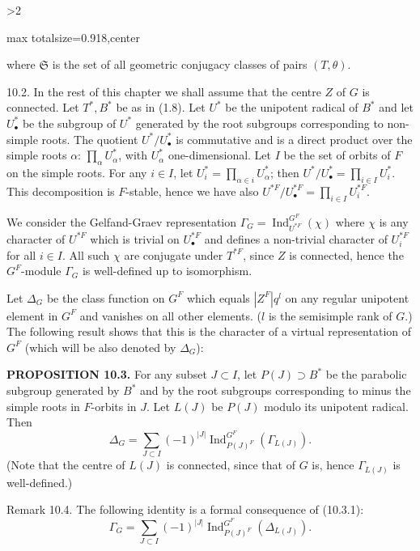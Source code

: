 \documentclass[9pt,twoside]{extarticle}
\newcommand{\EditionPage}[3]{%
  \ifnum#1>2\clearpage\fi
  \pdfbookmark[1]{Printed page #2}{en-folio-#2}%
  \hypertarget{en-physical-#1}{}%
  \noindent\begin{adjustbox}{max totalsize={\textwidth}{0.918\textheight},center}
  \begin{minipage}[t]{\textwidth}
  \fontsize{9.4}{11.1}\selectfont\justifying
  #3
  \end{minipage}
  \end{adjustbox}%
}
\begin{document}
\EditionPage{54}{155}{%
where \(\mathfrak S\) is the set of all geometric conjugacy classes of pairs \((T,\theta)\).\par

10.2. In the rest of this chapter we shall assume that the centre \(Z\) of \(G\) is connected. Let \(T^*,B^*\) be as in (1.8). Let \(U^*\) be the unipotent radical of \(B^*\) and let \(U_\bullet^*\) be the subgroup of \(U^*\) generated by the root subgroups corresponding to non-simple roots. The quotient \(U^*/U_\bullet^*\) is commutative and is a direct product over the simple roots \(\alpha\): \(\prod_\alpha U_\alpha^*\), with \(U_\alpha^*\) one-dimensional. Let \(I\) be the set of orbits of \(F\) on the simple roots. For any \(i\in I\), let \(U_i^*=\prod_{\alpha\in i}U_\alpha^*\); then \(U^*/U_\bullet^*=\prod_{i\in I}U_i^*\). This decomposition is \(F\)-stable, hence we have also \(U^{*F}/U_\bullet^{*F}=\prod_{i\in I}U_i^{*F}\).\par

We consider the Gelfand-Graev representation \(\Gamma_G=\operatorname{Ind}_{U^{*F}}^{G^F}(\chi)\) where \(\chi\) is any character of \(U^{*F}\) which is trivial on \(U_\bullet^{*F}\) and defines a non-trivial character of \(U_i^{*F}\) for all \(i\in I\). All such \(\chi\) are conjugate under \(T^{*F}\), since \(Z\) is connected, hence the \(G^F\)-module \(\Gamma_G\) is well-defined up to isomorphism.\par

Let \(\Delta_G\) be the class function on \(G^F\) which equals \(|Z^F|q^l\) on any regular unipotent element in \(G^F\) and vanishes on all other elements. (\(l\) is the semisimple rank of \(G\).) The following result shows that this is the character of a virtual representation of \(G^F\) (which will be also denoted by \(\Delta_G\)):\par

\noindent\textbf{PROPOSITION 10.3.} For any subset \(J\subset I\), let \(P(J)\supset B^*\) be the parabolic subgroup generated by \(B^*\) and by the root subgroups corresponding to minus the simple roots in \(F\)-orbits in \(J\). Let \(L(J)\) be \(P(J)\) modulo its unipotent radical. Then \[
\tag{10.3.1}
\Delta_G
=
\sum_{J\subset I}(-1)^{|J|}
\operatorname{Ind}_{P(J)^F}^{G^F}(\Gamma_{L(J)}).
\] (Note that the centre of \(L(J)\) is connected, since that of \(G\) is, hence \(\Gamma_{L(J)}\) is well-defined.)\par

Remark 10.4. The following identity is a formal consequence of (10.3.1): \[
\Gamma_G
=
\sum_{J\subset I}(-1)^{|J|}
\operatorname{Ind}_{P(J)^F}^{G^F}(\Delta_{L(J)}).
\]\par

}
\end{document}
